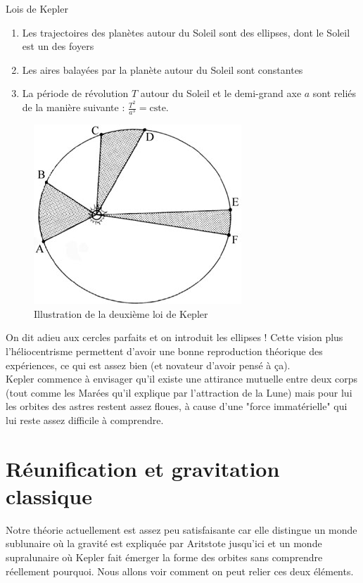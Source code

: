 \documentclass{classe}
\begin{document}
\begin{théorème}{Lois de Kepler}{}
	\begin{enumerate}
	\item Les trajectoires des planètes autour du Soleil sont des ellipses, dont le Soleil est un des foyers
	\item Les aires balayées par la planète autour du Soleil sont constantes
	\item La période de révolution $T$ autour du Soleil et le demi-grand axe $a$ sont reliés de la manière suivante : $\frac{T^2}{a^3} = \textrm{cste}$.
	\end{enumerate}
\end{théorème}

\begin{figure}[H]
\centering
\includegraphics[scale=1.5]{2LDK.jpg}
\caption{Illustration de la deuxième loi de Kepler}
\end{figure}

On dit adieu aux cercles parfaits et on introduit les ellipses ! Cette vision plus l'héliocentrisme permettent d'avoir une bonne reproduction théorique des expériences, ce qui est assez bien (et novateur d'avoir pensé à ça).\\

Kepler commence à envisager qu'il existe une attirance mutuelle entre deux corps (tout comme les Marées qu'il explique par l'attraction de la Lune) mais pour lui les orbites des astres restent assez floues, à cause d'une "force immatérielle" qui lui reste assez difficile à comprendre.

\section{Réunification et gravitation classique}

Notre théorie actuellement est assez peu satisfaisante car elle distingue un monde sublunaire où la gravité est expliquée par Aritstote jusqu'ici et un monde supralunaire où Kepler fait émerger la forme des orbites sans comprendre réellement pourquoi. Nous allons voir comment on peut relier ces deux éléments.
\end{document}
